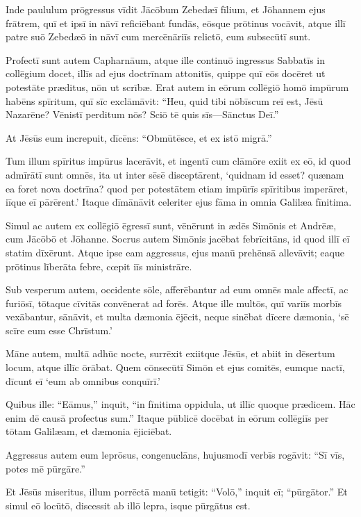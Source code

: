 \Versus Inde paululum prōgressus vīdit Jācōbum Zebedæī fīlium, et Jōhannem ejus frātrem, quī et ipsī in nāvī reficiēbant fundās,
\Versus eōsque prōtinus vocāvit, atque illī patre suō Zebedæō in nāvī cum mercēnāriīs relictō, eum subsecūtī sunt.

\Versus Profectī sunt autem Capharnāum, atque ille continuō ingressus Sabbatīs in collēgium docet,
\Versus illīs ad ejus doctrīnam attonitīs, quippe quī eōs docēret ut potestāte præditus, nōn ut scrībæ.
\Versus Erat autem in eōrum collēgiō homō impūrum habēns spīritum, quī sīc exclāmāvit:
\Versus ``Heu, quid tibi nōbīscum reī est, Jēsū Nazarēne? Vēnistī perditum nōs? Sciō tē quis sīs—Sānctus Deī.''

\Versus At Jēsūs eum increpuit, dīcēns: ``Obmūtēsce, et ex istō migrā.''

\Versus Tum illum spīritus impūrus lacerāvit, et ingentī cum clāmōre exiit ex eō,
\Versus id quod admīrātī sunt omnēs, ita ut inter sēsē disceptārent, `quidnam id esset? quænam ea foret nova doctrīna? quod per potestātem etiam impūrīs spīritibus imperāret, iīque eī pārērent.'
\Versus Itaque dīmānāvit celeriter ejus fāma in omnia Galilæa fīnitima.

\Versus Simul ac autem ex collēgiō ēgressī sunt, vēnērunt in ædēs Simōnis et Andrēæ, cum Jācōbō et Jōhanne.
\Versus Socrus autem Simōnis jacēbat febrīcitāns, id quod illī eī statim dīxērunt.
\Versus Atque ipse eam aggressus, ejus manū prehēnsā allevāvit; eaque prōtinus līberāta febre, cœpit iīs ministrāre.

\Versus Sub vesperum autem, occidente sōle, afferēbantur ad eum omnēs male affectī, ac furiōsī,
\Versus tōtaque cīvitās convēnerat ad forēs.
\Versus Atque ille multōs, quī variīs morbīs vexābantur, sānāvit, et multa dæmonia ējēcit, neque sinēbat dīcere dæmonia, `sē scīre eum esse Chrīstum.'

\Versus Māne autem, multā adhūc nocte, surrēxit exiitque Jēsūs, et abiit in dēsertum locum, atque illīc ōrābat.
\Versus Quem cōnsecūtī Simōn et ejus comitēs,
\Versus eumque nactī, dīcunt eī `eum ab omnibus conquīrī.'

\Versus Quibus ille: ``Eāmus,'' inquit, ``in fīnitima oppidula, ut illīc quoque prædicem. Hāc enim dē causā profectus sum.''
\Versus Itaque pūblicē docēbat in eōrum collēgiīs per tōtam Galilæam, et dæmonia ējiciēbat.

\Versus Aggressus autem eum leprōsus, congenuclāns, hujusmodī verbīs rogāvit: ``Sī vīs, potes mē pūrgāre.''

\Versus Et Jēsūs miseritus, illum porrēctā manū tetigit: ``Volō,'' inquit eī; ``pūrgātor.''
\Versus Et simul eō locūtō, discessit ab illō lepra, isque pūrgātus est.


